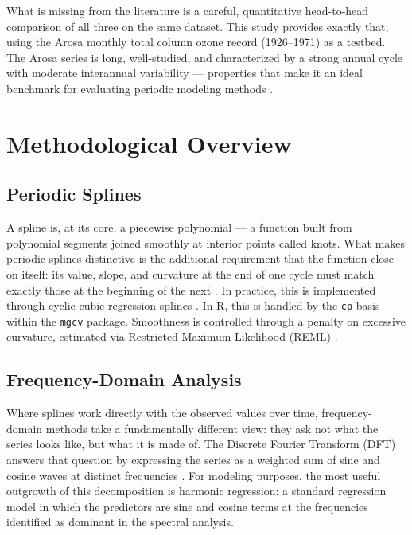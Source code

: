 \documentclass[12pt,a4paper]{article}
\begin{document}
What is missing from the literature is a careful, quantitative head-to-head comparison of all three on the same dataset. This study provides exactly that, using the Arosa monthly total column ozone record (1926–1971) as a testbed. The Arosa series is long, well-studied, and characterized by a strong annual cycle with moderate interannual variability — properties that make it an ideal benchmark for evaluating periodic modeling methods \cite{Wood2017}.

\section{Methodological Overview}

\subsection{Periodic Splines}
A spline is, at its core, a piecewise polynomial — a function built from polynomial segments joined smoothly at interior points called knots. What makes periodic splines distinctive is the additional requirement that the function close on itself: its value, slope, and curvature at the end of one cycle must match exactly those at the beginning of the next \cite{Wood2017}. In practice, this is implemented through cyclic cubic regression splines \cite{Kano2008}. In R, this is handled by the \texttt{cp} basis within the \texttt{mgcv} package. Smoothness is controlled through a penalty on excessive curvature, estimated via Restricted Maximum Likelihood (REML) \cite{Wood2017, Eilers1996}.

\subsection{Frequency-Domain Analysis}
Where splines work directly with the observed values over time, frequency-domain methods take a fundamentally different view: they ask not what the series looks like, but what it is made of. The Discrete Fourier Transform (DFT) answers that question by expressing the series as a weighted sum of sine and cosine waves at distinct frequencies \cite{Shumway2017, Bloomfield2000}. For modeling purposes, the most useful outgrowth of this decomposition is harmonic regression: a standard regression model in which the predictors are sine and cosine terms at the frequencies identified as dominant in the spectral analysis.
\end{document}
